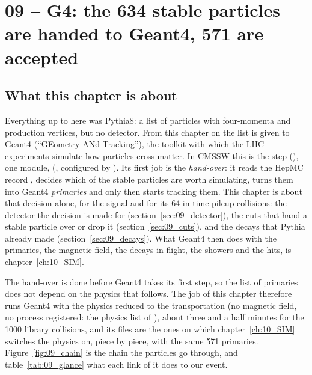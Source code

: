 
\chapter{09 -- G4: the 634 stable particles are handed to Geant4, 571 are accepted}
\label{ch:09_G4}

\section{What this chapter is about}

Everything up to here was Pythia8: a list of particles with four-momenta and production vertices, but no
detector. From this chapter on the list is given to Geant4 (``GEometry ANd Tracking''), the toolkit with which
the LHC experiments simulate how particles cross matter. In CMSSW this is the  step
(), one module,  (, configured by
). Its first job is the \emph{hand-over}: it reads the HepMC
record , decides which of the stable particles are worth simulating, turns them into Geant4
\emph{primaries} and only then starts tracking them. This chapter is about that decision alone, for the signal and
for its 64 in-time pileup collisions: the detector the decision is made for (section~\ref{sec:09_detector}), the
cuts that hand a stable particle over or drop it (section~\ref{sec:09_cuts}), and the decays that Pythia already
made (section~\ref{sec:09_decays}). What Geant4 then does with the primaries, the magnetic field, the decays in
flight, the showers and the hits, is chapter~\ref{ch:10_SIM}.

The hand-over is done before Geant4 takes its first step, so the list of primaries does not depend on the physics
that follows. The job of this chapter therefore runs Geant4 with the physics reduced to the transportation (no
magnetic field, no process registered: the physics list  of
), about three and a half minutes for the 1000 library
collisions, and its files are the ones on which chapter~\ref{ch:10_SIM} switches the physics on, piece by piece,
with the same 571 primaries. Figure~\ref{fig:09_chain} is the chain the particles go through, and
table~\ref{tab:09_glance} what each link of it does to our event.

